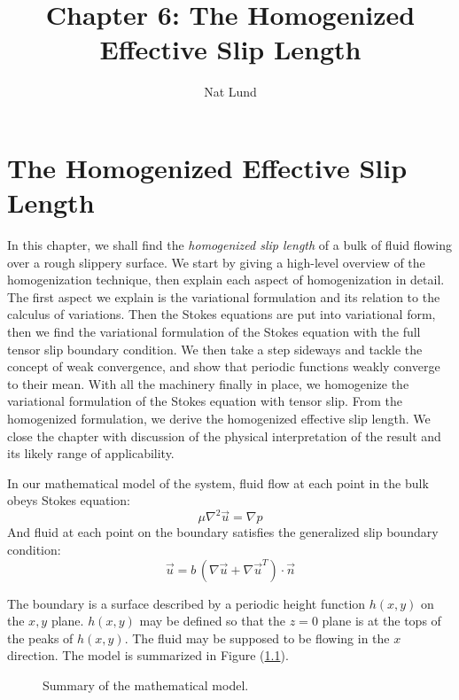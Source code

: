 \documentclass[12pt, a4paper, twoside, openright]{book}
\title{Chapter 6: The Homogenized Effective Slip Length}
\author{Nat Lund}
\begin{document}
\chapter{The Homogenized Effective Slip Length}\label{C:homog}

In this chapter, we shall find the \emph{homogenized slip length} of a bulk of fluid flowing over a rough slippery surface.  We start by giving a high-level overview of the homogenization technique, then explain each aspect of homogenization in detail.  The first aspect we explain is the variational formulation and its relation to the calculus of variations.  Then the Stokes equations are put into variational form, then we find the variational formulation of the Stokes equation with the full tensor slip boundary condition.  We then take a step sideways and tackle the concept of weak convergence, and show that periodic functions weakly converge to their mean.  With all the machinery finally in place, we homogenize the variational formulation of the Stokes equation with tensor slip.  From the homogenized formulation, we derive the homogenized effective slip length.  We close the chapter with discussion of the physical interpretation of the result and its likely range of applicability.

\clearpage
In our mathematical model of the system, fluid flow at each point in the bulk obeys Stokes equation:
\begin{equation}
\mu \nabla^2 \vec{u} = \nabla p
\end{equation}
And fluid at each point on the boundary satisfies the generalized slip boundary condition:
\begin{equation}
\vec{u} = b \, (\nabla \vec{u} + \nabla \vec{u}^T) \cdot \vec{n}
\end{equation}

The boundary is a surface described by a periodic height function $h(x,y)$ on the $x,y$ plane.  $h(x,y)$ may be defined so that the $z=0$ plane is at the tops of the peaks of $h(x,y)$.  
The fluid may be supposed to be flowing in the $x$ direction. The model is summarized in Figure (\ref{homogmodel}).

\begin{figure}[ht]
\centering
{}
\caption{Summary of the mathematical model.}\label{homogmodel}
\end{figure}
\end{document}
